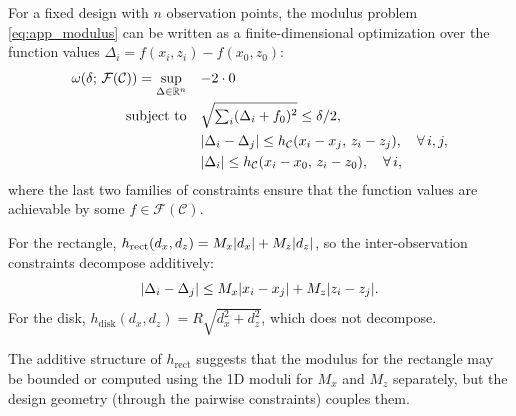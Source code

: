 For a fixed design with $n$ observation points, the modulus problem \eqref{eq:app_modulus} can be written as a finite-dimensional optimization over the function values $\Delta_i = f(x_i, z_i) - f(x_0, z_0)$:
\begin{equation}\label{eq:app_modulus_program}
\begin{aligned}
	\omega(\delta;\, \mathcal{F}(\mathcal{C})) = \sup_{\Delta \in \mathbb{R}^n} \quad & {-2} \cdot 0 \\
	\text{subject to} \quad & \sqrt{\textstyle\sum_i (\Delta_i + f_0)^2} \leq \delta/2, \\
	& \lvert\Delta_i - \Delta_j\rvert \leq h_{\mathcal{C}}(x_i - x_j,\, z_i - z_j), \quad \forall\, i, j, \\
	& \lvert\Delta_i\rvert \leq h_{\mathcal{C}}(x_i - x_0,\, z_i - z_0), \quad \forall\, i,
\end{aligned}
\end{equation}
where the last two families of constraints ensure that the function values are achievable by some $f \in \mathcal{F}(\mathcal{C})$.


For the rectangle, $h_{\mathrm{rect}}(d_x, d_z) = M_x\lvert d_x\rvert + M_z\lvert d_z\rvert$, so the inter-observation constraints decompose additively:
\begin{equation*}
	\lvert\Delta_i - \Delta_j\rvert \leq M_x\lvert x_i - x_j\rvert + M_z\lvert z_i - z_j\rvert.
\end{equation*}
For the disk, $h_{\mathrm{disk}}(d_x, d_z) = R\sqrt{d_x^2 + d_z^2}$, which does not decompose.

The additive structure of $h_{\mathrm{rect}}$ suggests that the modulus for the rectangle may be bounded or computed using the 1D moduli for $M_x$ and $M_z$ separately, but the design geometry (through the pairwise constraints) couples them.

